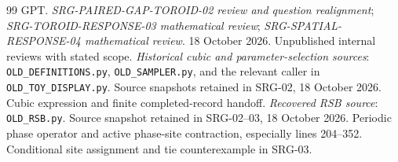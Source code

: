 \begin{thebibliography}{99}
 GPT. \emph{SRG-PAIRED-GAP-TOROID-02 review and question realignment}; \emph{SRG-TOROID-RESPONSE-03 mathematical review}; \emph{SRG-SPATIAL-RESPONSE-04 mathematical review}. 18 October 2026. Unpublished internal reviews with stated scope.
 \emph{Historical cubic and parameter-selection sources}: \texttt{OLD\_DEFINITIONS.py}, \texttt{OLD\_SAMPLER.py}, and the relevant caller in \texttt{OLD\_TOY\_DISPLAY.py}. Source snapshots retained in SRG-02, 18 October 2026. Cubic expression and finite completed-record handoff.
 \emph{Recovered RSB source}: \texttt{OLD\_RSB.py}. Source snapshot retained in SRG-02--03, 18 October 2026. Periodic phase operator and active phase-site contraction, especially lines 204--352. Conditional site assignment and tie counterexample in SRG-03.
\end{thebibliography}
